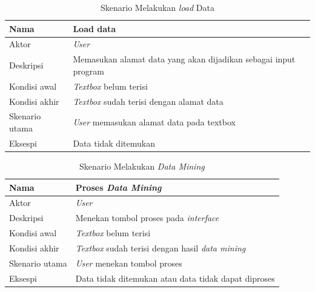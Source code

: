 \begin{table}[H]
\caption{Skenario Melakukan \textsl{load} Data}
\begin{tabular}{|l|l|}
\hline
Nama           & Load data                                                       \\ \hline
Aktor          & \textit{User}                                                   \\ \hline
Deskripsi      & Memasukan alamat data yang akan dijadikan sebagai input program \\ \hline
Kondisi awal   & \textsl{Textbox} belum terisi                                   \\ \hline
Kondisi akhir  & \textsl{Textbox} sudah terisi dengan alamat data                \\ \hline
Skenario utama & \textit{User} memasukan alamat data pada textbox                \\ \hline
Eksespi        & Data tidak ditemukan                                            \\ \hline
\end{tabular}
\end{table}

\begin{table}[H]
\caption{Skenario Melakukan \textsl{Data Mining}}
\begin{tabular}{|l|l|}
\hline
Nama           & Proses \textsl{Data Mining }                      								\\ \hline
Aktor          & \textit{User}                                 										\\ \hline
Deskripsi      & Menekan tombol proses pada \textsl{interface}       					    \\ \hline
Kondisi awal   & \textsl{Textbox} belum terisi                          					\\ \hline
Kondisi akhir  & \textsl{Textbox} sudah terisi dengan hasil \textsl{data mining}  \\ \hline
Skenario utama & \textit{User} menekan tombol proses         										  \\ \hline
Eksespi        & Data tidak ditemukan atau data tidak dapat diproses    		  	  \\ \hline
\end{tabular}
\end{table}


